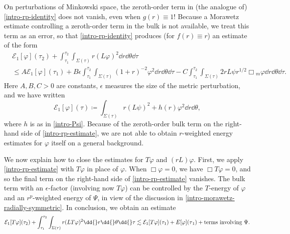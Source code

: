 \documentclass[10pt, reqno]{amsart}
\begin{document}
On perturbations of Minkowski space, the zeroth-order term in (the analogue of)
\cref{intro-rp-identity} does not vanish, even when \(g(r)\equiv 1\)! Because a
Morawetz estimate controlling a zeroth-order term in the bulk is not available,
we treat this term as an error, so that \cref{intro-rp-identity} produces (for
\(f(r)\equiv r\)) an estimate of the form
\begin{equation}\label{intro-rp-estimate}
\begin{split}
&\mathcal{E}_{1}[\varphi{}](\tau{}_2) + \int_{\tau{}_1}^{\tau{}_2} \int _{\Sigma{}(\tau{})} r(L\varphi{})^2\dd{}r\dd{}\theta{}\dd{}\tau{} \\
&\le A\mathcal{E}_{1}[\varphi{}](\tau{}_1) +  B\epsilon{}\int_{\tau{}_1}^{\tau{}_2} \int _{\Sigma{}(\tau{})} (1+r)^{-2}\varphi^2\dd{}r\dd{}\theta{}\dd{}\tau{} - C\int_{\tau{}_1}^{\tau{}_2} \int _{\Sigma{}(\tau{})} 2rL\psi{}r^{1/2}\Box{}_{m}\varphi{} \dd{}r\dd{}\theta{}\dd{}\tau{}.
\end{split}
\end{equation}
Here \(A,B,C > 0\) are constants, \(\epsilon{}\) measures the size of the metric
perturbation, and we have written
\begin{equation}\label{intro-E1}
\mathcal{E}_1[\varphi{}](\tau{})\coloneqq{}\int _{\Sigma{}(\tau{})} r(L\psi{})^2 + h(r)\varphi^2\dd{}r\dd{}\theta{},
\end{equation}
where \(h\) is as in \cref{intro-Psi}. Because of the zeroth-order bulk term on the
right-hand side of \cref{intro-rp-estimate}, we are not able to obtain
\(r\)-weighted energy estimates for \(\varphi{}\) itself on a general background.

We now explain how to close the estimates for \(T\varphi{}\) and \((rL)\varphi{}\). First, we
apply \cref{intro-rp-estimate} with \(T\varphi{}\) in place of \(\varphi{}\). When
\(\Box{}\varphi{} = 0\), we have \(\Box{}T\varphi{} = 0\), and so the final term
on the right-hand side of \cref{intro-rp-estimate} vanishes. The bulk term with an
\(\epsilon{}\)-factor (involving now \(T\varphi{}\)) can be controlled by the
\(T\)-energy of \(\varphi{}\) and an \(r^p\)-weighted energy of \(\Psi{}\), in
view of the discussion in \cref{intro-morawetz-radially-symmetric}. In conclusion,
we obtain an estimate
\begin{equation}\label{intro-E1-Tphi}
\mathcal{E}_1[T\varphi{}](\tau_2) + \int_{\tau_1}^{\tau_2} \int _{\Sigma{}(\tau{})} r(LT\varphi{})^2\dd{}r\dd{}\theta{}\dd{}\tau{} \lesssim \mathcal{E}_1[T\varphi{}](\tau_1) + E[\varphi{}](\tau{}_1) + \textnormal{terms involving }\Psi{}.
\end{equation}
\end{document}
